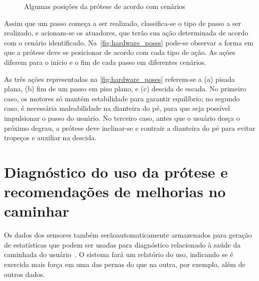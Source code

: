 \begin{figure}[h]
	\caption{\label{fig:hardware_poses}Algumas posições da prótese de acordo com cenários}
	\begin{center}
	\end{center}
\end{figure}

Assim que um passo começa a ser realizado, classifica-se o tipo de passo a ser realizado, e acionam-se os atuadores, que terão sua ação determinada de acordo com o cenário identificado. Na~\autoref{fig:hardware_poses} pode-se observar a forma em que a prótese deve se posicionar de acordo com cada tipo de ação. As ações diferem para o início e o fim de cada passo em diferentes cenários.

As três ações representadas na \autoref{fig:hardware_poses} referem-se a (a) pisada plana, (b) fim de um passo em piso plano, e (c) descida de escada. No primeiro caso, os motores só mantém estabilidade para garantir equilíbrio; no segundo caso, é necessária maleabilidade na dianteira do pé, para que seja possível impulsionar o passo do usuário. No terceiro caso, antes que o usuário desça o próximo degrau, a prótese deve inclinar-se e contrair a dianteira do pé para evitar tropeços e auxiliar na descida.

\section{Diagnóstico do uso da prótese e recomendações de melhorias no caminhar}\label{sec:metodo_diagnostico}
Os dados dos sensores também serãoautomaticamente armazenados para geração de estatísticas que podem ser usadas para diagnóstico relacionado à saúde da caminhada do usuário~\cite{SabatiniMSC05}. O sistema fará um relatório do uso, indicando se é exercida mais força em uma das pernas do que na outra, por exemplo, além de outros dados.


